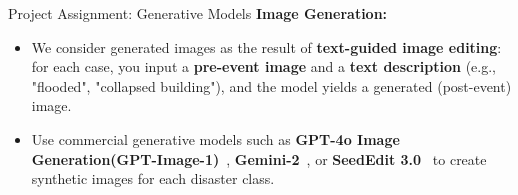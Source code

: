   \begin{refsection}
    \begin{frame}{Project Assignment: Generative Models}
      \textbf{Image Generation:}
      \begin{itemize}
        \item We consider generated images as the result of \textbf{text-guided image editing}: for each case, you input a \textbf{pre-event image} and a \textbf{text description} (e.g., "flooded", "collapsed building"), and the model yields a generated (post-event) image.
        \item Use commercial generative models such as \textbf{GPT-4o Image Generation(GPT-Image-1)}~\parencite{gptimage1}, \textbf{Gemini-2}~\parencite{geminiteamgoogleGemini25Pushing}, or \textbf{SeedEdit 3.0}~\parencite{wang2025seedit} to create synthetic images for each disaster class.
      \end{itemize}
      \bottomleftrefs
    \end{frame}
  \end{refsection}
  
